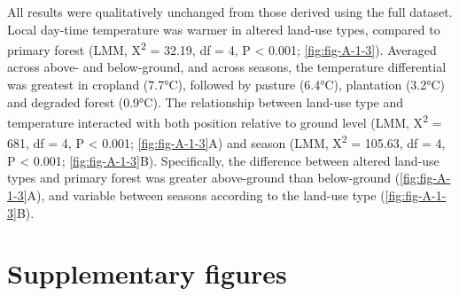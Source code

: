 \documentclass[12pt,a4paper,]{report}
\theoremstyle{definition}
\theoremstyle{definition}
\theoremstyle{definition}
\theoremstyle{remark}
\begin{document}
All results were qualitatively unchanged from those derived using the
full dataset. Local day-time temperature was warmer in altered land-use
types, compared to primary forest (LMM, Χ\textsuperscript{2} = 32.19, df
= 4, P \textless{} 0.001; \autoref{fig:fig-A-1-3}). Averaged across
above- and below-ground, and across seasons, the temperature
differential was greatest in cropland (7.7°C), followed by pasture
(6.4°C), plantation (3.2°C) and degraded forest (0.9°C). The
relationship between land-use type and temperature interacted with both
position relative to ground level (LMM, Χ\textsuperscript{2} = 681, df =
4, P \textless{} 0.001; \autoref{fig:fig-A-1-3}A) and season (LMM,
Χ\textsuperscript{2} = 105.63, df = 4, P \textless{} 0.001;
\autoref{fig:fig-A-1-3}B). Specifically, the difference between altered
land-use types and primary forest was greater above-ground than
below-ground (\autoref{fig:fig-A-1-3}A), and variable between seasons
according to the land-use type (\autoref{fig:fig-A-1-3}B).

\pagebreak

\section{Supplementary figures}\label{supplementary-figures}
\end{document}
